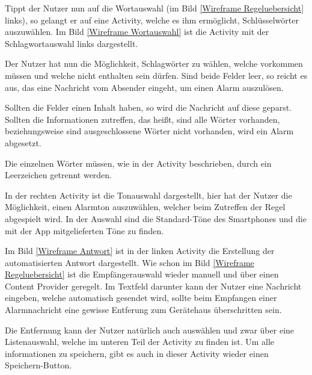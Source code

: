 Tippt der Nutzer nun auf die Wortauswahl (im Bild \ref{Wireframe Regeluebersicht} links), so gelangt er auf eine Activity, welche es ihm erm\"oglicht, Schl\"usselw\"orter auszuw\"ahlen. Im Bild \ref{Wireframe Wortauswahl} ist die Activity mit der Schlagwortauswahl links dargestellt. 

Der Nutzer hat nun die M\"oglichkeit, Schlagw\"orter zu w\"ahlen, welche vorkommen m\"ussen und welche nicht enthalten sein d\"urfen. Sind beide Felder leer, so reicht es aus, das eine Nachricht vom Absender eingeht, um einen Alarm auszul\"osen.

Sollten die Felder einen Inhalt haben, so wird die Nachricht auf diese geparst. Sollten die Informationen zutreffen, das hei\ss{}t, sind alle W\"orter vorhanden, beziehungsweise sind ausgeschlossene W\"orter nicht vorhanden, wird ein Alarm abgesetzt. 

Die einzelnen W\"orter m\"ussen, wie in der Activity beschrieben, durch ein Leerzeichen getrennt werden.

In der rechten Activity ist die Tonauswahl dargestellt, hier hat der Nutzer die M\"oglichkeit, einen Alarmton auszuw\"ahlen, welcher beim Zutreffen der Regel abgespielt wird. In der Auswahl sind die Standard-T\"one des Smartphones und die mit der App mitgelieferten T\"one zu finden.

Im Bild \ref{Wireframe Antwort} ist in der linken Activity die Erstellung der automatisierten Antwort dargestellt. Wie schon im Bild \ref{Wireframe Regeluebersicht} ist die Empf\"angerauswahl wieder manuell und \"uber einen Content Provider geregelt. Im Textfeld darunter kann der Nutzer eine Nachricht eingeben, welche automatisch gesendet wird, sollte beim Empfangen einer Alarmnachricht eine gewisse Entferung zum Ger\"atehaus \"uberschritten sein.

Die Entfernung kann der Nutzer nat\"urlich auch ausw\"ahlen und zwar \"uber eine Listenauswahl, welche im unteren Teil der Activity zu finden ist. Um alle informationen zu speichern, gibt es auch in dieser Activity wieder einen Speichern-Button.

